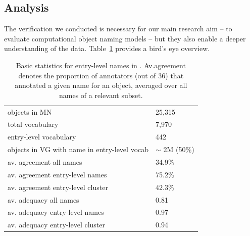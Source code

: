 

\subsection{Analysis}
\label{sect:mn_analysis}

The verification we conducted is necessary for our main research aim -- to evaluate computational object naming models -- but they also enable a deeper understanding of the \mn data.
Table~\ref{tab:stat-entry-level} provides a bird's eye overview.
\begin{table}[t]
	\centering
	\small
	\begin{tabular}{p{5cm}l}
		\toprule		
		objects in MN & 25,315\\
		total vocabulary &  7,970\\
		entry-level vocabulary & 442\\
		objects in VG with name in entry-level vocab & $\sim$ 2M (50\%)\\
		\midrule
		av. agreement all names & 34.9\%\\
		av. agreement entry-level names & 75.2\%\\
		av. agreement entry-level cluster & 42.3\%\\
		\midrule
		av. adequacy all names & 0.81\\
		av. adequacy entry-level names & 0.97 \\
		av. adequacy entry-level cluster & 0.94 \\
		\bottomrule	
	\end{tabular}
	\caption{Basic statistics for entry-level names in \mn. Av.agreement denotes the proportion of annotators (out of 36) that annotated a given name for an object, averaged over all names of a relevant subset.}
	\label{tab:stat-entry-level}
\end{table}


